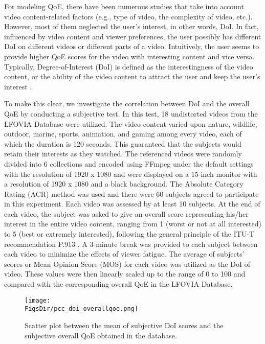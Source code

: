 For modeling QoE, there have been numerous studies that take into account video content-related factors (e.g., type of video, the complexity of video, etc.). However, most of them neglected the user's interest, in other words, DoI. In fact, influenced by video content and viewer preferences, the user possibly has different DoI on different videos or different parts of a video. Intuitively, the user seems to provide higher QoE scores for the video with interesting content and vice versa. Typically, Degree-of-Interest (DoI) \cite{DegreeOfLiking_SOS} is defined as the interestingness of the video content, or the ability of the video content to attract the user and keep the user's interest \cite{VisualContent}.

To make this clear, we investigate the correlation between DoI and the overall QoE by conducting a subjective test. In this test, 18 undistorted videos from the LFOVIA Database \cite{LFOVIA} were utilized. The video content varied upon nature, wildlife, outdoor, marine, sports, animation, and gaming \cite{LFOVIA} among every video, each of which the duration is 120 seconds. This guaranteed that the subjects would retain their interests as they watched.
The referenced videos were randomly divided into 6 collections and encoded using FFmpeg \cite{FFmpeg} under the default settings with the resolution of 1920 x 1080 and were displayed on a 15-inch monitor with a resolution of 1920 x 1080 and a black background. The Absolute Category Rating (ACR) \cite{ITUT_P913} method was used and there were 60 subjects agreed to participate in this experiment. Each video was assessed by at least 10 subjects. At the end of each video, the subject was asked to give an overall score representing his/her interest in the entire video content, ranging from 1 (worst or not at all interested) to 5 (best or extremely interested), following the general principle of the ITU-T recommendation P.913 \cite{ITUT_P913}. A 3-minute break was provided to each subject between each video to minimize the effects of viewer fatigue. The average of subjects' scores or Mean Opinion Score (MOS) for each video was utilized as the DoI of video. These values were then linearly scaled up to the range of 0 to 100 and compared with the corresponding overall QoE in the LFOVIA Database.

\begin{figure}[tb]
  \begin{center}
    \texttt{[image: \\FigsDir/pcc\_doi\_overallqoe.png]}
  \end{center}
  \caption{Scatter plot between the mean of subjective DoI scores and the subjective overall QoE obtained in the database.}
  \label{fig:PCC_DoI_OverallQoE}
\end{figure}

